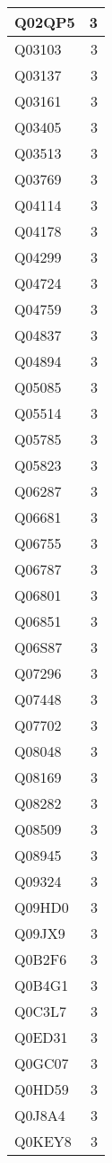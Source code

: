 \documentclass[
]{book}
\theoremstyle{definition}
\theoremstyle{definition}
\theoremstyle{definition}
\theoremstyle{definition}
\theoremstyle{remark}
\begin{document}
\begin{table}
\begin{tabular}{l|r}
\hline
Q02QP5 & 3\\
\hline
Q03103 & 3\\
\hline
Q03137 & 3\\
\hline
Q03161 & 3\\
\hline
Q03405 & 3\\
\hline
Q03513 & 3\\
\hline
Q03769 & 3\\
\hline
Q04114 & 3\\
\hline
Q04178 & 3\\
\hline
Q04299 & 3\\
\hline
Q04724 & 3\\
\hline
Q04759 & 3\\
\hline
Q04837 & 3\\
\hline
Q04894 & 3\\
\hline
Q05085 & 3\\
\hline
Q05514 & 3\\
\hline
Q05785 & 3\\
\hline
Q05823 & 3\\
\hline
Q06287 & 3\\
\hline
Q06681 & 3\\
\hline
Q06755 & 3\\
\hline
Q06787 & 3\\
\hline
Q06801 & 3\\
\hline
Q06851 & 3\\
\hline
Q06S87 & 3\\
\hline
Q07296 & 3\\
\hline
Q07448 & 3\\
\hline
Q07702 & 3\\
\hline
Q08048 & 3\\
\hline
Q08169 & 3\\
\hline
Q08282 & 3\\
\hline
Q08509 & 3\\
\hline
Q08945 & 3\\
\hline
Q09324 & 3\\
\hline
Q09HD0 & 3\\
\hline
Q09JX9 & 3\\
\hline
Q0B2F6 & 3\\
\hline
Q0B4G1 & 3\\
\hline
Q0C3L7 & 3\\
\hline
Q0ED31 & 3\\
\hline
Q0GC07 & 3\\
\hline
Q0HD59 & 3\\
\hline
Q0J8A4 & 3\\
\hline
Q0KEY8 & 3\\

\end{tabular}
\end{table}
\end{document}
